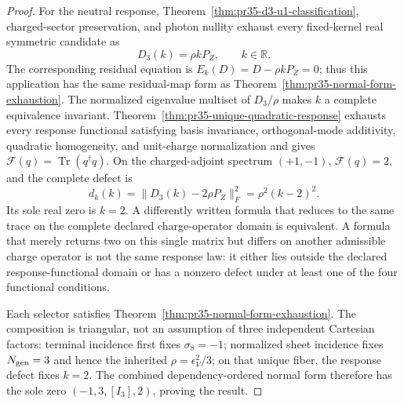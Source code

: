 \begin{proof}
For the neutral response, Theorem~\ref{thm:pr35-d3-u1-classification}, charged-sector preservation, and photon nullity exhaust every fixed-kernel real symmetric candidate as
\begin{equation}
 D_3(k)=\rho kP_Z,
 \qquad k\in\mathbb R.
\end{equation}
The corresponding residual equation is $E_k(D)=D-\rho kP_Z=0$; thus this application has the same residual-map form as Theorem~\ref{thm:pr35-normal-form-exhaustion}. The normalized eigenvalue multiset of $D_3/\rho$ makes $k$ a complete equivalence invariant.  Theorem~\ref{thm:pr35-unique-quadratic-response} exhausts every response functional satisfying basis invariance, orthogonal-mode
additivity, quadratic homogeneity, and unit-charge normalization and gives $\mathcal F(q)=\operatorname{Tr}(q^\dagger q)$.  On the charged-adjoint spectrum $(+1,-1)$, $\mathcal F(q)=2$, and the complete defect is 
\begin{equation}
 d_k(k)=\|D_3(k)-2\rho P_Z\|_F^2
 =\rho^2(k-2)^2.
\end{equation}
Its sole real zero is $k=2$.  A differently written formula that reduces to the same trace on the complete declared charge-operator domain is equivalent. A formula that merely returns two on this single matrix but differs on another admissible charge operator is not the same response law: it either lies outside the declared response-functional domain or has a nonzero defect under at least
one of the four functional conditions.

Each selector satisfies
Theorem~\ref{thm:pr35-normal-form-exhaustion}.  The composition is triangular, not an assumption of three independent Cartesian factors: terminal incidence first fixes $\sigma_8=-1$; normalized sheet incidence fixes $N_{\rm gen}=3$ and hence the inherited $\rho=\epsilon_V^2/3$; on that unique
fiber, the response defect fixes $k=2$.  The combined dependency-ordered normal form therefore has the sole zero $(-1,3,[I_3],2)$, proving the result.
\end{proof}

